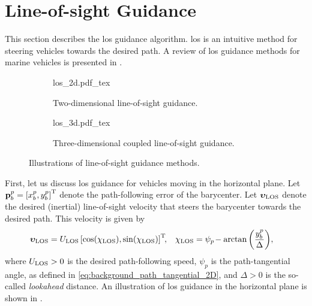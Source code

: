 \section{Line-of-sight Guidance}
\label{sec:background_LOS}

This section describes the \gls{los} guidance algorithm.
\gls{los} is an intuitive method for steering vehicles towards the desired path.
A review of \gls{los} guidance methods for marine vehicles is presented in \cite{gu_LOS_2023}.

\begin{figure}[b]
    \centering
    \begin{subfigure}{0.48\textwidth}
        \centering
        \def\svgwidth{0.9\textwidth}
        {los_2d.pdf_tex}
        \caption{Two-dimensional line-of-sight guidance.}
        \label{fig:background_los_2d}
    \end{subfigure}
    \begin{subfigure}{0.48\textwidth}
        \def\svgwidth{\textwidth}
        {los_3d.pdf_tex}
        \caption{Three-dimensional coupled line-of-sight guidance.}
        \label{fig:background_los_3d}
    \end{subfigure}
    \caption{Illustrations of line-of-sight guidance methods.}
\end{figure}

First, let us discuss \gls{los} guidance for vehicles moving in the horizontal plane.
Let $\mathbf{p}_b^p = \left[x_b^p, y_b^p\right]^{\mathrm{T}}$ denote the path-following error of the barycenter.
Let $\bm{\upsilon}_{\rm LOS}$ denote the desired (inertial) line-of-sight velocity that steers the barycenter towards the desired path.
This velocity is given by \cite{fossen_handbook_2011,pettersen_waypoint_2001}
\begin{align}
    \bm{\upsilon}_{\rm LOS} &= U_{\rm LOS} \left[\cos(\chi_{\rm LOS}), \sin(\chi_{\rm LOS})\right]^{\mathrm{T}}\!\!, &
    \chi_{\rm LOS} &= \psi_{p\!} - \arctan\left(\frac{y_b^p}{\Delta}\right)\!,
    \label{eq:background_los_2d}
\end{align}
where $U_{\rm LOS} > 0$ is the desired path-following speed, $\psi_p$ is the path-tangential angle, as defined in \eqref{eq:background_path_tangential_2D}, and $\Delta > 0$ is the so-called \emph{lookahead} distance.
An illustration of \gls{los} guidance in the horizontal plane is shown in .

